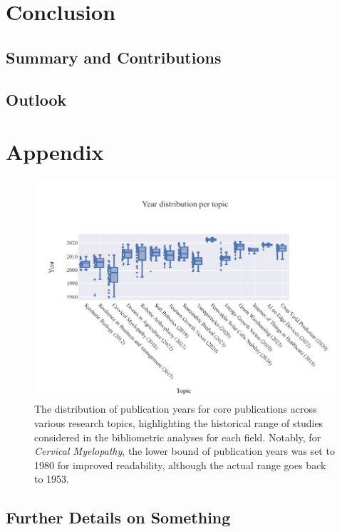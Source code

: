 \documentclass[%
  a4paper,fontsize=11pt,abstract=on,%
  twoside,BCOR=19mm,%
]{scrreprt}
\begin{document}
\chapter{Conclusion}\label{ch:conclusion}
\lipsum[1]
\section{Summary and Contributions}
\lipsum[1-3]
\section{Outlook}
\lipsum[1-3]



\appendix
\chapter{Appendix}
\begin{figure}
	\centering	
	\includegraphics{pics/year-distribution.pdf}
	\caption[Distribution of publication years per topic]{The distribution of publication years for core publications across various research topics, highlighting the historical range of studies considered in the bibliometric analyses for each field. Notably, for \textit{Cervical Myelopathy}, the lower bound of publication years was set to 1980 for improved readability, although the actual range goes back to 1953.}
	\label{fig:dataset-years}
\end{figure}
\section{Further Details on Something}
\lipsum



\printbibliography


\end{document}
